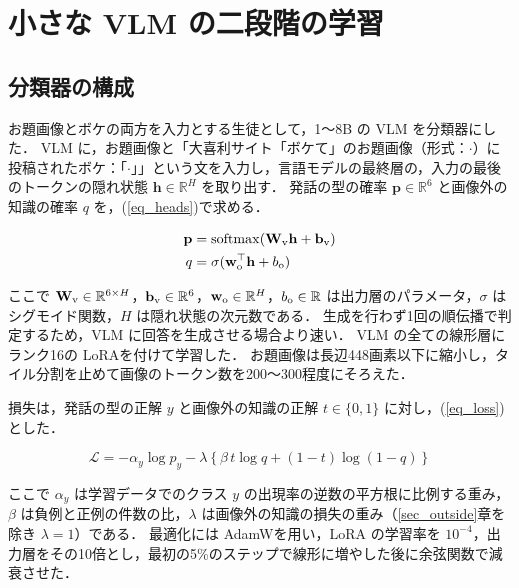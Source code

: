 \section{小さな VLM の二段階の学習}
\label{sec_vlm}
\subsection{分類器の構成}
お題画像とボケの両方を入力とする生徒として，1〜8B の VLM を分類器にした．
VLM に，お題画像と「大喜利サイト「ボケて」のお題画像（形式：$ \cdot $）に投稿されたボケ：「$ \cdot $」」という文を入力し，言語モデルの最終層の，入力の最後のトークンの隠れ状態 $ {\mathbf h} \in {\mathbb R}^{H} $ を取り出す．
発話の型の確率 $ {\mathbf p} \in {\mathbb R}^{6} $ と画像外の知識の確率 $ q $ を，(\ref{eq_heads})で求める．

\begin{align}
    {\mathbf p} &= {\rm softmax} ( {\mathbf W}_{\rm v} {\mathbf h} + {\mathbf b}_{\rm v} ) \nonumber \\
    q &= \sigma ( {\mathbf w}_{\rm o}^{\top} {\mathbf h} + b_{\rm o} )
    \label{eq_heads}
\end{align}

\noindent
ここで $ {\mathbf W}_{\rm v} \in {\mathbb R}^{6 \times H} $，$ {\mathbf b}_{\rm v} \in {\mathbb R}^{6} $，$ {\mathbf w}_{\rm o} \in {\mathbb R}^{H} $，$ b_{\rm o} \in {\mathbb R} $ は出力層のパラメータ，$ \sigma $ はシグモイド関数，$ H $ は隠れ状態の次元数である．
生成を行わず1回の順伝播で判定するため，VLM に回答を生成させる場合より速い．
VLM の全ての線形層にランク16の LoRA\cite{ref_lora}を付けて学習した．
お題画像は長辺448画素以下に縮小し，タイル分割を止めて画像のトークン数を200〜300程度にそろえた．

損失は，発話の型の正解 $ y $ と画像外の知識の正解 $ t \in \{0, 1\} $ に対し，(\ref{eq_loss})とした．

\begin{equation}
    {\mathcal L} = - \alpha_{y} \log p_{y} - \lambda \left\{ \beta \, t \log q + (1 - t) \log (1 - q) \right\}
    \label{eq_loss}
\end{equation}

\noindent
ここで $ \alpha_{y} $ は学習データでのクラス $ y $ の出現率の逆数の平方根に比例する重み，$ \beta $ は負例と正例の件数の比，$ \lambda $ は画像外の知識の損失の重み（\ref{sec_outside}章を除き $ \lambda = 1 $）である．
最適化には AdamW\cite{ref_adamw}を用い，LoRA の学習率を $ 10^{-4} $，出力層をその10倍とし，最初の5\%のステップで線形に増やした後に余弦関数で減衰させた．

